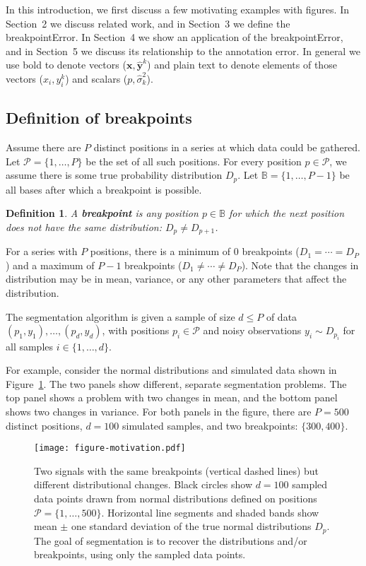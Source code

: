 \documentclass{article}
\newtheorem{definition}{Definition}
\begin{document}
In this introduction, we first discuss a few motivating examples with
figures. In Section~2 we discuss related work, and in Section~3 we
define the breakpointError. In Section~4 we show an
application of the breakpointError, and in Section~5 we discuss its
relationship to the annotation error. In general we use bold to denote
vectors ($\mathbf x, \mathbf{\hat y}^k$) and plain text to denote
elements of those vectors ($x_i, y_i^k$) and scalars ($p, \hat
\sigma^2_k$).

\subsection{Definition of breakpoints}

Assume there are $P$ distinct positions in a series at
which data could be gathered. Let $\mathcal P= \{1,\dots,P\}$ be the
set of all such positions. For every position $p\in\mathcal P$, we
assume there is some true probability distribution $D_p$. Let $\mathbb
B=\{1,\dots,P-1\}$ be all bases after which a breakpoint is possible.

\begin{definition}
  A \textbf{breakpoint} is any position $p\in\mathbb B$ for which the
  next position does not have the same distribution: $D_p \neq
  D_{p+1}$. 
\end{definition}

For a series with $P$ positions, there is a minimum of 0 breakpoints
($D_1=\cdots=D_P$) and a maximum of $P-1$ breakpoints ($D_1 \neq
\cdots \neq D_P$). Note that the changes in distribution may be in
mean, variance, or any other parameters that affect the distribution.

The segmentation algorithm is given a sample of size $d \leq P$ of
data $(p_1, y_1), \dots, (p_d, y_d)$, with positions $p_i\in\mathcal
P$ and noisy observations $y_i\sim D_{p_i}$ for all samples $i\in\{1,
\dots, d\}$.

\newpage

For example, consider the normal distributions and simulated data
shown in Figure~\ref{fig:motivation}. The two panels show different,
separate segmentation problems. The top panel shows a problem with two
changes in mean, and the bottom panel shows two changes in
variance. For both panels in the figure, there are $P=500$ distinct
positions, $d=100$ simulated samples, and two breakpoints:
$\{300, 400\}$.

\begin{figure}[h!]
  \centering
  \texttt{[image: figure-motivation.pdf]}
  \vskip -0.5cm
  \caption{Two signals with the same breakpoints (vertical dashed
    lines) but different distributional changes. Black circles show
    $d=100$ sampled data points drawn from normal distributions
    defined on positions $\mathcal P=\{1, \dots, 500\}$. Horizontal
    line segments and shaded bands show mean $\pm$ one standard
    deviation of the true normal distributions $D_p$. The goal of segmentation
    is to recover the distributions and/or breakpoints, using only the
    sampled data points.}
  \label{fig:motivation}
\end{figure}
\end{document}
